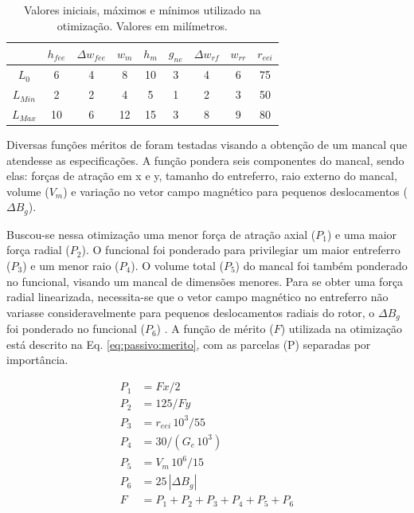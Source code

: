\begin{table}[ht!]
	\centering
	\begin{tabular}{c c c c c c c c c}
		& $h_{fee}$ &$\Delta w_{fee}$ & $w_m$ & $h_m$  & $g_{ne}$ & $\Delta w_{rf}$ & $w_{rr}$ & $r_{eei}$ \\ \hline \hline
		
		$L_{0}$ 	&  6 &   4 &    8 &    10 &   3 &  4 &   6 &    75 \\
		$L_{Min}$ &  2    &  2   &  4  &   5&    1  & 2  &  3&    50\\			
		$L_{Max}$ &  10 &  6 &  12  &   15  &  3  &  8  &   9   &   80		
	\end{tabular} 
	\caption{Valores iniciais, máximos e mínimos utilizado na otimização. Valores em milímetros.}
	\label{tab:passivo:restrições} 
\end{table}

Diversas funções méritos de foram testadas visando a obtenção de um mancal que atendesse as especificações. A função pondera seis componentes do mancal, sendo elas: forças de atração em x e y, tamanho do entreferro, raio externo do mancal,  volume ($V_m$) e variação no vetor campo magnético para pequenos deslocamentos ($\Delta B_{g}$).

Buscou-se nessa otimização uma menor força de atração axial ($P_1$) e uma maior força radial ($P_2$). O funcional foi ponderado para privilegiar um maior entreferro ($P_3$) e um menor raio ($P_4$). O volume total ($P_5$) do mancal foi também ponderado no funcional, visando um mancal de dimensões menores. Para se obter uma força radial linearizada, necessita-se que o vetor campo magnético no entreferro não variasse consideravelmente para pequenos deslocamentos radiais do rotor, o $\Delta B_{g}$ foi ponderado no funcional ($P_6$) . A função de mérito ($F$) utilizada na otimização está descrito na Eq. \ref{eq:passivo:merito}, com as parcelas (P) separadas por importância.

\begin{align}
P_1 &= Fx/2 				\\ 
P_2 &= 125/Fy		\\        
P_3 &= r_{eei}\, 10^3/55 \\     
P_4&= 30/(G_e \,  10^3) \\    
P_5 &= V_m\, 10^6/15 \\        
P_6 &= 25 \,  |{\Delta B_{g}}|\\   
F &= P_1 + P_2 + P_3 + P_4 + P_5 + P_6   \label{eq:passivo:merito}
\end{align}

